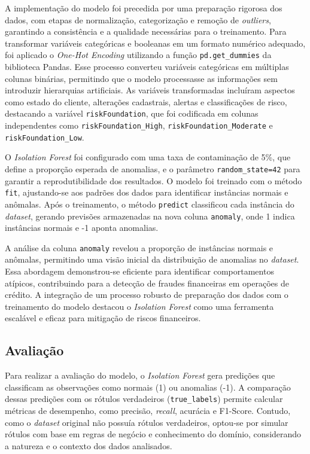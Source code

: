 \documentclass[12pt,a4paper]{article}
\begin{document}
A implementação do modelo foi precedida por uma preparação rigorosa dos dados, com etapas de normalização, categorização e remoção de \textit{outliers}, garantindo a consistência e a qualidade necessárias para o treinamento. Para transformar variáveis categóricas e booleanas em um formato numérico adequado, foi aplicado o \textit{One-Hot Encoding} utilizando a função \texttt{pd.get\_dummies} da biblioteca Pandas. Esse processo converteu variáveis categóricas em múltiplas colunas binárias, permitindo que o modelo processasse as informações sem introduzir hierarquias artificiais. As variáveis transformadas incluíram aspectos como estado do cliente, alterações cadastrais, alertas e classificações de risco, destacando a variável \texttt{riskFoundation}, que foi codificada em colunas independentes como \texttt{riskFoundation\_High}, \texttt{riskFoundation\_Moderate} e \texttt{riskFoundation\_Low}.

O \textit{Isolation Forest} foi configurado com uma taxa de contaminação de 5\%, que define a proporção esperada de anomalias, e o parâmetro \texttt{random\_state=42} para garantir a reprodutibilidade dos resultados. O modelo foi treinado com o método \texttt{fit}, ajustando-se aos padrões dos dados para identificar instâncias normais e anômalas. Após o treinamento, o método \texttt{predict} classificou cada instância do \textit{dataset}, gerando previsões armazenadas na nova coluna \texttt{anomaly}, onde 1 indica instâncias normais e -1 aponta anomalias.

A análise da coluna \texttt{anomaly} revelou a proporção de instâncias normais e anômalas, permitindo uma visão inicial da distribuição de anomalias no \textit{dataset}. Essa abordagem demonstrou-se eficiente para identificar comportamentos atípicos, contribuindo para a detecção de fraudes financeiras em operações de crédito. A integração de um processo robusto de preparação dos dados com o treinamento do modelo destacou o \textit{Isolation Forest} como uma ferramenta escalável e eficaz para mitigação de riscos financeiros.

\subsection{Avaliação}

Para realizar a avaliação do modelo, o \textit{Isolation Forest} gera predições que classificam as observações como normais (1) ou anomalias (-1). A comparação dessas predições com os rótulos verdadeiros (\texttt{true\_labels}) permite calcular métricas de desempenho, como precisão, \textit{recall}, acurácia e F1-Score. Contudo, como o \textit{dataset} original não possuía rótulos verdadeiros, optou-se por simular rótulos com base em regras de negócio e conhecimento do domínio, considerando a natureza e o contexto dos dados analisados.
\end{document}
